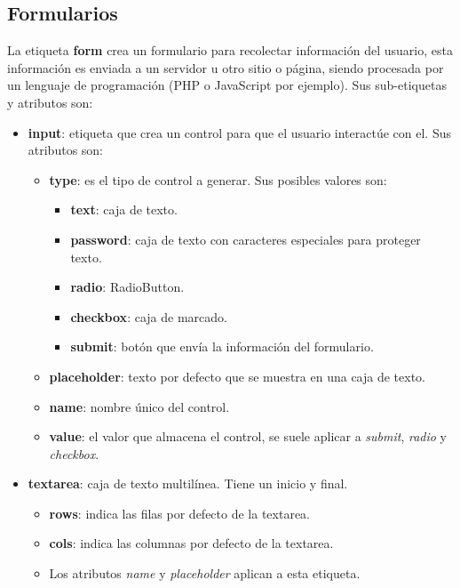 \subsection{Formularios}
\hspace{0.55cm}La etiqueta \textbf{form} crea un formulario para recolectar información del usuario, esta información es enviada a un servidor u otro sitio o página, siendo procesada por un lenguaje de programación (PHP o JavaScript por ejemplo). Sus sub-etiquetas y atributos son:
\begin{itemize}
    \item \textbf{input}: etiqueta que crea un control para que el usuario interactúe con el. Sus atributos son:
    \begin{itemize}
        \item \textbf{type}: es el tipo de control a generar. Sus posibles valores son:
        \begin{itemize}
            \item \textbf{text}: caja de texto.
            \item \textbf{password}: caja de texto con caracteres especiales para proteger texto.
            \item \textbf{radio}: RadioButton.
            \item \textbf{checkbox}: caja de marcado.
            \item \textbf{submit}: botón que envía la información del formulario.
        \end{itemize}
        \item \textbf{placeholder}: texto por defecto que se muestra en una caja de texto.
        \item \textbf{name}: nombre único del control.
        \item \textbf{value}: el valor que almacena el control, se suele aplicar a \textit{submit}, \textit{radio} y \textit{checkbox}.
    \end{itemize}
    \item \textbf{textarea}: caja de texto multilínea. Tiene un inicio y final.
    \begin{itemize}
        \item \textbf{rows}: indica las filas por defecto de la textarea.
        \item \textbf{cols}: indica las columnas por defecto de la textarea.
        \item Los atributos \textit{name} y \textit{placeholder} aplican a esta etiqueta.
    \end{itemize}

\end{itemize}
